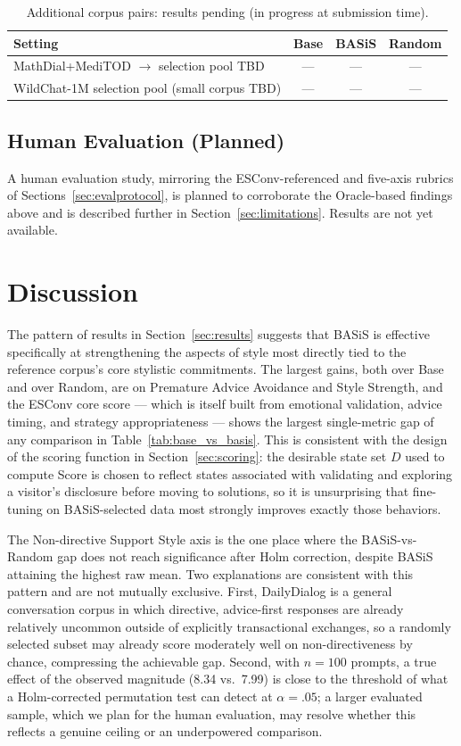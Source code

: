 \documentclass[manuscript,review,anonymous]{acmart}
\begin{document}
\begin{table}[t]
  \caption{Additional corpus pairs: results pending (in progress at submission time).}
  \label{tab:pending}
  \begin{tabular}{lccc}
    \toprule
    Setting & Base & BASiS & Random \\
    \midrule
    MathDial+MediTOD $\to$ selection pool TBD & --- & --- & --- \\
    WildChat-1M selection pool (small corpus TBD) & --- & --- & --- \\
    \bottomrule
  \end{tabular}
\end{table}

\subsection{Human Evaluation (Planned)}
A human evaluation study, mirroring the ESConv-referenced and five-axis rubrics of Sections~\ref{sec:evalprotocol}, is planned to corroborate the Oracle-based findings above and is described further in Section~\ref{sec:limitations}. Results are not yet available.


\section{Discussion}
\label{sec:discussion}

The pattern of results in Section~\ref{sec:results} suggests that BASiS is effective specifically at strengthening the aspects of style most directly tied to the reference corpus's core stylistic commitments. The largest gains, both over Base and over Random, are on Premature Advice Avoidance and Style Strength, and the ESConv core score --- which is itself built from emotional validation, advice timing, and strategy appropriateness --- shows the largest single-metric gap of any comparison in Table~\ref{tab:base_vs_basis}. This is consistent with the design of the scoring function in Section~\ref{sec:scoring}: the desirable state set $D$ used to compute Score is chosen to reflect states associated with validating and exploring a visitor's disclosure before moving to solutions, so it is unsurprising that fine-tuning on BASiS-selected data most strongly improves exactly those behaviors.

The Non-directive Support Style axis is the one place where the BASiS-vs-Random gap does not reach significance after Holm correction, despite BASiS attaining the highest raw mean. Two explanations are consistent with this pattern and are not mutually exclusive. First, DailyDialog is a general conversation corpus in which directive, advice-first responses are already relatively uncommon outside of explicitly transactional exchanges, so a randomly selected subset may already score moderately well on non-directiveness by chance, compressing the achievable gap. Second, with $n=100$ prompts, a true effect of the observed magnitude (8.34 vs.\ 7.99) is close to the threshold of what a Holm-corrected permutation test can detect at $\alpha=.05$; a larger evaluated sample, which we plan for the human evaluation, may resolve whether this reflects a genuine ceiling or an underpowered comparison.
\end{document}
